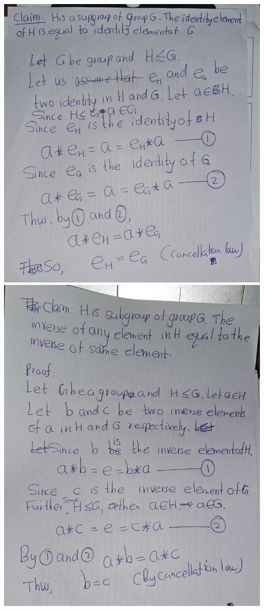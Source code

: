 \documentclass[
]{book}
\theoremstyle{definition}
\theoremstyle{definition}
\theoremstyle{definition}
\theoremstyle{definition}
\theoremstyle{remark}
\begin{document}
\includegraphics{figures/ch_2/fig49.jpg}
\includegraphics{figures/ch_2/fig50.jpg}
\end{document}
